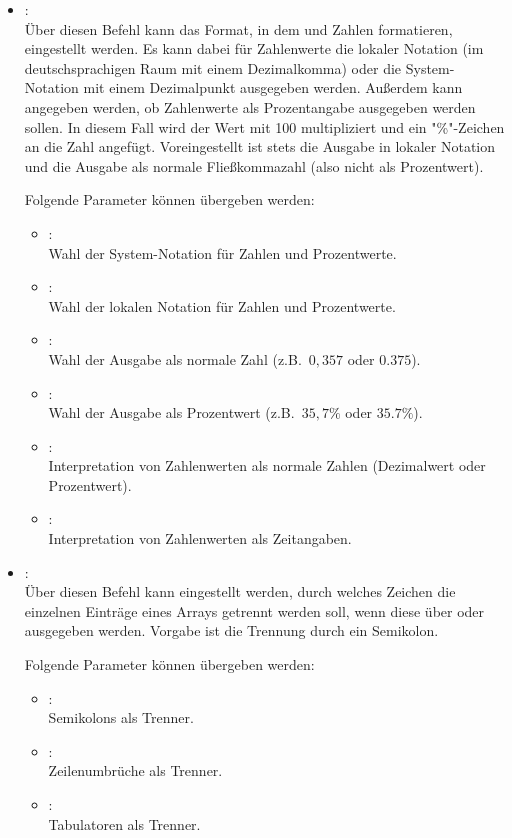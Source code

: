 \begin{itemize}

\item
{}:\\
Über diesen Befehl kann das Format, in dem  und 
Zahlen formatieren, eingestellt werden. Es kann dabei für Zahlenwerte die lokaler Notation (im deutschsprachigen
Raum mit einem Dezimalkomma) oder die System-Notation mit einem Dezimalpunkt ausgegeben werden. Außerdem
kann angegeben werden, ob Zahlenwerte als Prozentangabe ausgegeben werden sollen. In diesem Fall wird
der Wert mit 100 multipliziert und ein "\%"-Zeichen an die Zahl angefügt. Voreingestellt ist stets die
Ausgabe in lokaler Notation und die Ausgabe als normale Fließkommazahl (also nicht als Prozentwert).

Folgende Parameter können  übergeben werden:
\begin{itemize}
\item
{}:\\
Wahl der System-Notation für Zahlen und Prozentwerte.
\item
{}:\\
Wahl der lokalen Notation für Zahlen und Prozentwerte.
\item
{}:\\
Wahl der Ausgabe als normale Zahl (z.B.\ $0{,}357$ oder $0.375$).
\item
{}:\\
Wahl der Ausgabe als Prozentwert (z.B.\ $35,7\%$ oder $35.7\%$).
\item
{}:\\
Interpretation von Zahlenwerten als normale Zahlen (Dezimalwert oder Prozentwert).
\item
{}:\\
Interpretation von Zahlenwerten als Zeitangaben.

\end{itemize}

\item
{}:\\
Über diesen Befehl kann eingestellt werden, durch welches Zeichen die einzelnen Einträge
eines Arrays getrennt werden soll, wenn diese über  oder
 ausgegeben werden.
Vorgabe ist die Trennung durch ein Semikolon.

Folgende Parameter können  übergeben werden:
\begin{itemize}
\item
{}:\\
Semikolons als Trenner.
\item
{}:\\
Zeilenumbrüche als Trenner.
\item
{}:\\
Tabulatoren als Trenner.
\end{itemize}


\end{itemize}
